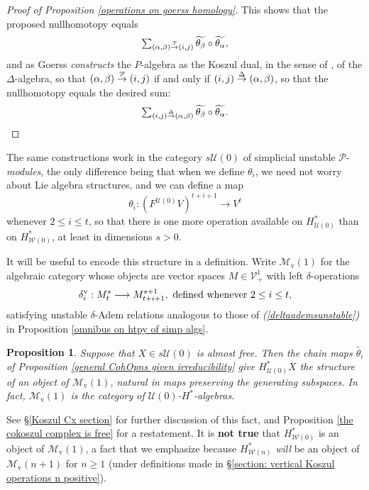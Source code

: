 \documentclass[11pt]{amsart} \renewcommand{\baselinestretch}{1.2}
\theoremstyle{plain}
\newtheorem{prop}[thm]{Proposition}
\numberwithin{equation}{section} %
\theoremstyle{plain}
\newtheorem{prop}[thm]{Proposition}
\numberwithin{equation}{chapter} %
\renewcommand{\to}{\longrightarrow}
\newcommand{\calU}{\mathcal{U}}
\newcommand{\calP}{\mathcal{P}}
\newcommand{\calV}{\mathcal{V}}
\newcommand{\calw}{\mathcal{W}}
\newcommand{\calMv}{\mathcal{M}\dver}
\newcommand{\Palg}{{\calP}}
\newcommand{\vect}[2]{\calV^{#1}_{#2}}
\newcommand{\produces}[3]{#3:#1\sim #2}
\renewcommand{\produces}[3]{#1\rightarrow_{#3} #2}%
\renewcommand{\produces}[3]{#1\overset{\smash{#3}}{\rightarrow} #2}%
\newcommand{\uver}{^\mathrm{v}}
\newcommand{\dver}{_\mathrm{v}}
\newcommand{\deltav}{\delta\uver}
\begin{document}
\begin{Cohomology Operations for W and U}
\begin{proof}[Proof of Proposition \ref{operations on goerss homology}]
This shows that the proposed nullhomotopy equals  
\[\textstyle\sum_{\produces{(\alpha,\beta)}{(i,j)}{\Palg}}\widetilde{\theta_\beta}\circ\widetilde{\theta_\alpha},\]
 and as Goerss \cite{MR1089001} \emph{constructs} the $P$-algebra as the Koszul dual, in the sense of \cite{PriddyKoszul.pdf}, of the $\Delta$-algebra, so that $\produces{(\alpha,\beta)}{(i,j)}{\Palg}$ if and only if $\produces{(i,j)}{(\alpha,\beta)}{\Delta}$, so that the nullhomotopy equals the desired sum:
\[\textstyle\sum_{\produces{(i,j)}{(\alpha,\beta)}{\Delta}}\widetilde{\theta_\beta}\circ\widetilde{\theta_\alpha}.\qedhere\]
\end{proof}
The same constructions work in the category $s\calU(0)$ of simplicial unstable $\Palg$-\emph{modules}, the only difference being that when we define $\theta_i$, we need not worry about Lie algebra structures, and we can define a map
\[\theta_i:(F^{\calU(0)}V)^{t+i+1}\to V^t\]
whenever $2\leq i\leq t$, so that there is one more operation available on $H^*_{\calU(0)}$ than on $H^*_{\calw(0)}$, at least  in dimensions $s>0$.

It will be useful to encode this structure in a definition. Write $\calMv(1)$ for the algebraic category whose objects are vector spaces $M\in\vect{1}{+}$ with left $\delta$-operations
\[\deltav_i:M^{s}_t\to M^{s+1}_{t+i+1},\textup{ defined whenever $2\leq i\leq t$,}\]
satisfying unstable $\delta$-Adem relations analogous to those of \emph{(\ref{deltaademsunstable})} in Proposition \ref{omnibus on htpy of simp algs}.
\begin{prop}
\label{operations on untable P homology}
Suppose that $X\in s\calU(0)$ is almost free. Then the chain maps $\widetilde{\theta_i}$ of Proposition \ref{general CohOpns given irreducibility} give $H^*_{\calU(0)}X$ the structure of an object of $\calMv(1)$, natural in maps preserving the generating subspaces. In fact, $\calMv(1)$ is the category of $\calU(0)$-$H^*$-algebras.
\end{prop}
\noindent See \S\ref{Koszul Cx section} for further discussion of this fact, and Proposition \ref{the cokoszul complex is free} for a restatement. It is \textbf{not true} that $H^*_{\calw(0)}$ is an object of $\calMv(1)$, a fact that we emphasize because $H^*_{\calw(n)}$ \emph{will} be an object of $\calMv(n+1)$ for $n\geq 1$ (under definitions made in \S\ref{section: vertical Koszul operations n positive}).


\end{Cohomology Operations for W and U}
\end{document}
